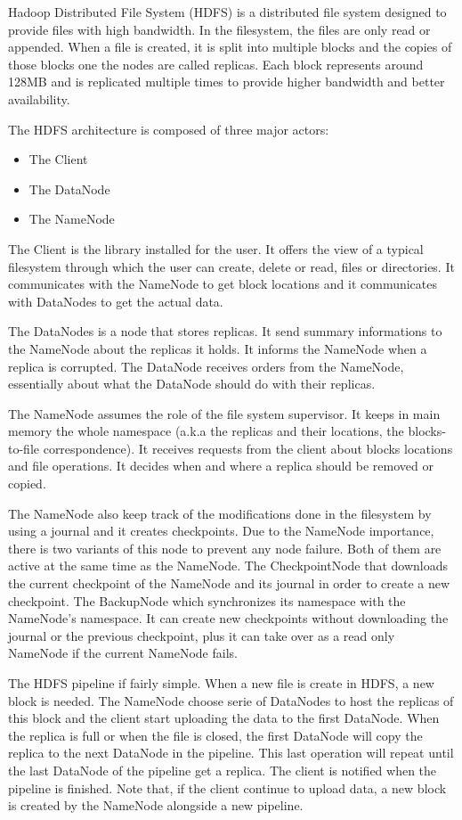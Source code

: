\documentclass{article}
\begin{document}
Hadoop Distributed File System (HDFS) is a distributed file system designed to provide files with high bandwidth.
In the filesystem, the files are only read or appended.
When a file is created, it is split into multiple blocks and the copies of those blocks one the nodes are called replicas.
Each block represents around 128MB and is replicated multiple times to provide higher bandwidth and better availability.

The HDFS architecture is composed of three major actors:
\begin{itemize}
	\item The Client
	\item The DataNode
	\item The NameNode
\end{itemize}

The Client is the library installed for the user.
It offers the view of a typical filesystem through which the user can create, delete or read, files or directories.
It communicates with the NameNode to get block locations and it communicates with DataNodes to get the actual data.

The DataNodes is a node that stores replicas.
It send summary informations to the NameNode about the replicas it holds.
It informs the NameNode when a replica is corrupted.
The DataNode receives orders from the NameNode, essentially about what the DataNode should do with their replicas.

The NameNode assumes the role of the file system supervisor.
It keeps in main memory the whole namespace (a.k.a the replicas and their locations, the blocks-to-file correspondence). 
It receives requests from the client about blocks locations and file operations.
It decides when and where a replica should be removed or copied.

The NameNode also keep track of the modifications done in the filesystem by using a journal and it creates checkpoints.
Due to the NameNode importance, there is two variants of this node to prevent any node failure.
Both of them are active at the same time as the NameNode.
The CheckpointNode that downloads the current checkpoint of the NameNode and its journal in order to create a new checkpoint.
The BackupNode which synchronizes its namespace with the NameNode's namespace.
It can create new checkpoints without downloading the journal or the previous checkpoint, plus it can take over as a read only NameNode if the current NameNode fails.

The HDFS pipeline if fairly simple.
When a new file is create in HDFS, a new block is needed.
The NameNode choose serie of DataNodes to host the replicas of this block and the client start uploading the data to the first DataNode.
When the replica is full or when the file is closed, the first DataNode will copy the replica to the next DataNode in the pipeline.
This last operation will repeat until the last DataNode of the pipeline get a replica.
The client is notified when the pipeline is finished.
Note that, if the client continue to upload data, a new block is created by the NameNode alongside a new pipeline.
\end{document}
